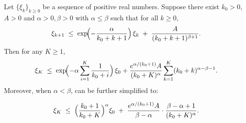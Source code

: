     \begin{lemma}\label{lem:chung-alpha-le-beta}
    Let $\{\xi_k\}_{k\ge 0}$ be a sequence of positive real numbers. Suppose there exist $k_0>0$, $A>0$ and
    $\alpha>0,\beta>0$ with $\alpha\le \beta$ such that for all $k\ge 0$,
    \begin{equation}\label{eq:rec-alpha-le-beta}
    \xi_{k+1}
    \;\le\;
    \exp\!\Bigl(-\frac{\alpha}{k_0+k+1}\Bigr)\,\xi_k
    \;+\;
    \frac{A}{(k_0+k+1)^{\beta+1}}.
    \end{equation}
    Then for any $K\ge 1$,
    \begin{equation}\label{eq:chung-master}
    \xi_K
    \;\le\;
    \exp\!\Bigl(-\alpha\sum_{i=1}^K\frac{1}{k_0+i}\Bigr)\,\xi_0+
    \frac{e^{\alpha/(k_0+1)}A}{(k_0+K)^{\alpha}}
    \sum_{k=1}^K (k_0+k)^{\alpha-\beta-1}.
    \end{equation}
    Moreover, when $\alpha < \beta$,  can be further simplified to:
    
    
    \begin{equation}\label{eq:chung-alpha-lt-beta}
    \xi_K
    \;\le\;
    \Bigl(\frac{k_0+1}{k_0+K}\Bigr)^{\alpha}\xi_0
    \;+\;
    \frac{e^{\alpha/(k_0+1)}A}{\beta-\alpha}\cdot
    \frac{\beta-\alpha+1}{(k_0+K)^{\alpha}}.
    \end{equation}
    \end{lemma}
    
